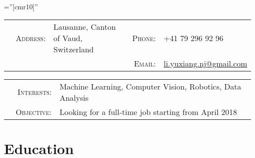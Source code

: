 \documentclass[a4paper,10pt]{article} %
\begin{document}
\pagestyle{empty} %

\font\fb=''[cmr10]'' %


\par{} %

\begin{tabular}{@{}p{0.66cm}rlp{2.5cm}rl}
& \textsc{Address:} & Lausanne, Canton of Vaud, Switzerland & & \textsc{Phone:} & +41 79 296 92 96 \\
& & & & \textsc{Email:} & \href{mailto:li.yuxiang.nj@gmail.com}{li.yuxiang.nj@gmail.com}
\end{tabular}

\begin{tabular}{p{0.205cm}rl}
& \textsc{Interests:} & Machine Learning, Computer Vision, Robotics, Data Analysis \\
& \textsc{Objective:} & Looking for a full-time job starting from April 2018 
\end{tabular}


\section{Education}
\end{document}
